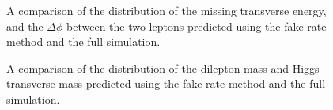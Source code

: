 \begin{figure}[!htbp]
\begin{center}
\caption{A comparison of the distribution of the missing transverse energy, 
and the $\Delta\phi$ between the two leptons predicted using the fake rate method and the
full simulation.}
\label{fig:FakeMuonClosureTest_MetAndDeltaPhi}
\end{center}
\end{figure}

\begin{figure}[!htbp]
\begin{center}
\caption{A comparison of the distribution of the dilepton mass and Higgs transverse mass 
predicted using the fake rate method and the full simulation.}
\label{fig:FakeMuonClosureTest_DileptonMassAndMtHiggs}
\end{center}
\end{figure}


